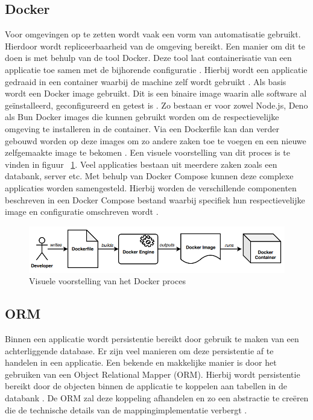 \subsection{Docker}
Voor omgevingen op te zetten wordt vaak een vorm van automatisatie gebruikt. 
Hierdoor wordt repliceerbaarheid van de omgeving bereikt. Een manier om dit te doen is met behulp van de tool Docker.
Deze tool laat containerisatie van een applicatie toe samen met de bijhorende configuratie \autocite{Ibrahim2021}.
Hierbij wordt een applicatie gedraaid in een container waarbij de machine zelf wordt gebruikt \autocite{Boettiger2015}.
Als basis wordt een Docker image gebruikt. Dit is een binaire image waarin alle software al geïnstalleerd, geconfigureerd en getest is \autocite{Boettiger2015}.
Zo bestaan er voor zowel Node.js, Deno als Bun Docker images die kunnen gebruikt worden om de respectievelijke omgeving te installeren in de container.
Via een Dockerfile kan dan verder gebouwd worden op deze images om zo andere zaken toe te voegen en een nieuwe zelfgemaakte image te bekomen \autocite{Boettiger2015}.
Een visuele voorstelling van dit proces is te vinden in figuur ~\ref{fig:dockerproces}.
Veel applicaties bestaan uit meerdere zaken zoals een databank, server etc. 
Met behulp van Docker Compose kunnen deze complexe applicaties worden samengesteld. 
Hierbij worden de verschillende componenten beschreven in een Docker Compose bestand waarbij specifiek hun
respectievelijke image en configuratie omschreven wordt \autocite{Ibrahim2021}.
\begin{figure}[H]
    \centering
    \includegraphics[width=.9\textwidth]{graphics/docker_proces.png}
    \caption[Docker proces]{\label{fig:dockerproces}Visuele voorstelling van het Docker proces ~\autocite{Ibrahim2021}}
\end{figure}

\subsection{ORM}
Binnen een applicatie wordt persistentie bereikt door gebruik te maken van een achterliggende database. 
Er zijn veel manieren om deze persistentie af te handelen in een applicatie.
Een bekende en makkelijke manier is door het gebruiken van een Object Relational Mapper (ORM).
Hierbij wordt persistentie bereikt door de objecten binnen de applicatie te koppelen aan tabellen in de databank \autocite{Lorenz2017}.
De ORM zal deze koppeling afhandelen en zo een abstractie te creëren die de technische details van de mappingimplementatie verbergt \autocite{Lorenz2017}.
